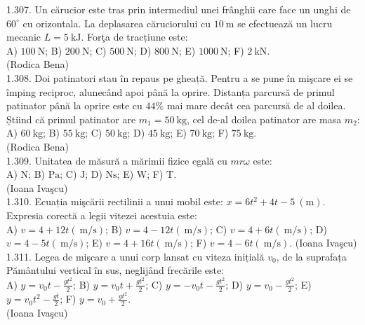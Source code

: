 {1.307. Un cărucior este tras prin intermediul unei frânghii care face un unghi de $60^{\circ}$ cu orizontala. La deplasarea căruciorului cu $10 \mathrm{~m}$ se efectuează un lucru mecanic $L=5 \mathrm{~kJ}$. Forţa de tracțiune este:\\ A) $100 \mathrm{~N}$; B) $200 \mathrm{~N}$; C) $500 \mathrm{~N}$; D) $800 \mathrm{~N}$; E) $1000 \mathrm{~N}$; F) $2 \mathrm{~kN}$.\\ (Rodica Bena)\\

1.308. Doi patinatori stau în repaus pe gheață. Pentru a se pune în mişcare ei se împing reciproc, alunecând apoi până la oprire. Distanța parcursă de primul patinator până la oprire este cu $44 \%$ mai mare decât cea parcursă de al doilea. Știind că primul patinator are $m_{1}=50 \mathrm{~kg}$, cel de-al doilea patinator are masa $m_{2}$:\\ A) $60 \mathrm{~kg}$; B) $55 \mathrm{~kg}$; C) $50 \mathrm{~kg}$; D) $45 \mathrm{~kg}$; E) $70 \mathrm{~kg}$; F) $75 \mathrm{~kg}$.\\ (Rodica Bena)\\

1.309. Unitatea de măsură a mărimii fizice egală cu $m r \omega$ este:\\ A) $\mathrm{N}$; B) $\mathrm{Pa}$; C) $\mathrm{J}$; D) $\mathrm{Ns}$; E) $\mathrm{W}$; F) $\mathrm{T}$.\\ (Ioana Ivaşcu)\\

1.310. Ecuația mişcării rectilinii a unui mobil este: $x=6 t^{2}+4 t-5 \mathrm{~(m)}$. Expresia corectă a legii vitezei acestuia este:\\ A) $v=4+12 t(\mathrm{~m} / \mathrm{s})$; B) $v=4-12 t(\mathrm{~m} / \mathrm{s})$; C) $v=4+6 t(\mathrm{~m} / \mathrm{s})$; D) $v=4-5 t(\mathrm{~m} / \mathrm{s})$; E) $v=4+16 t(\mathrm{~m} / \mathrm{s})$; F) $v=4-6 t(\mathrm{~m} / \mathrm{s})$. (Ioana Ivaşcu)\\

1.311. Legea de mişcare a unui corp lansat cu viteza inițială $v_{0}$, de la suprafața Pământului vertical în sus, neglijând frecările este:\\ A) $y=v_{0} t-\frac{g t^{2}}{2}$; B) $y=v_{0} t+\frac{g t^{2}}{2}$; C) $y=-v_{0} t-\frac{g t^{2}}{2}$; D) $y=v_{0}-\frac{g t^{2}}{2}$; E) $y=v_{0} t^{2}-\frac{g t}{2}$; F) $y=v_{0}+\frac{g t^{2}}{2}$.\\ (Ioana Ivaşcu)\\

}
